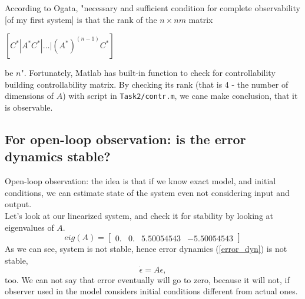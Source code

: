\documentclass[a4paper,12pt]{article}
\begin{document}
According to Ogata, "necessary and sufficient condition for complete observability [of my first system]
is that the rank of the $n\times nm$ matrix 
\begin{center}
    $[C^* | A^*C^* | \dots | (A^*)^{(n-1)}C^*]$
\end{center}
be $n$". Fortunately, Matlab has built-in function to check for controllability 
building controllability matrix. By checking its rank (that is 4 - the number of 
dimensions of $A$) with script in \texttt{Task2/contr.m}, we cane make conclusion,
that it is observable.

\subsection{For open-loop observation: is the error dynamics stable?}
Open-loop observation: the idea is that if we know exact model, and initial 
conditions, we can estimate state of the system even not considering input and 
output.\\
Let's look at our linearized system, and check it for stability by looking at 
eigenvalues of $A$.
\begin{equation*}
    eig(A) = 
    \begin{bmatrix}
        0. & 0. & 5.50054543 & -5.50054543
    \end{bmatrix}
\end{equation*}  
As we can see, system is not stable, hence error dynamics (\ref{error_dyn}) is not 
stable,
\begin{equation} \label{error_dyn}
    \dot \epsilon = A\epsilon,
\end{equation} 
too. We can not say that error eventually will go to zero, because it 
will not, if observer used in the model considers initial conditions different 
from actual ones.
\end{document}
